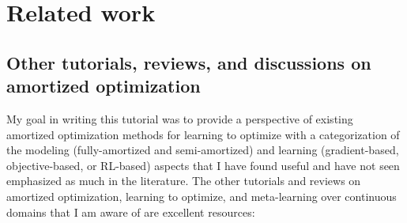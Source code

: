 \section{Related work}
\subsection{Other tutorials, reviews, and discussions
  on amortized optimization}
My goal in writing this tutorial was to provide a perspective
of existing amortized optimization methods for learning
to optimize with a categorization of the
modeling (fully-amortized and semi-amortized)
and learning (gradient-based, objective-based, or RL-based)
aspects that I have found useful and have not seen
emphasized as much in the literature.
The other tutorials and reviews on
amortized optimization, learning to optimize, and
meta-learning over continuous domains
that I am aware of are excellent resources:

